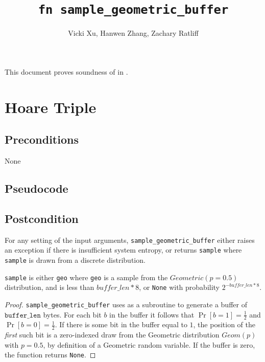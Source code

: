 \documentclass{article}
\title{\texttt{fn sample\_geometric\_buffer}}
\author{Vicki Xu, Hanwen Zhang, Zachary Ratliff}
\begin{document}
\maketitle

This document proves soundness of  in .

\section{Hoare Triple}
\subsection*{Preconditions}
None

\subsection*{Pseudocode}


\subsection*{Postcondition}
For any setting of the input arguments, \texttt{sample\_geometric\_buffer} either
raises an exception if there is insufficient system entropy,
or returns \texttt{sample} where \texttt{sample} is drawn from a discrete distribution.

\texttt{sample} is either
\texttt{geo} where \texttt{geo} is a sample from the $Geometric(p=0.5)$ distribution, and is less than $buffer\_len * 8$, or
\texttt{None} with probability $2^{-buffer\_len * 8}$.

\begin{proof}
    \texttt{sample\_geometric\_buffer} uses  as a subroutine to generate a buffer of $\texttt{buffer\_len}$ bytes.
    For each bit $b$ in the buffer it follows that $\Pr[b = 1] = \frac{1}{2}$ and $\Pr[b = 0] = \frac{1}{2}$.
    If there is some bit in the buffer equal to $1$,
    the position of the \emph{first} such bit is a zero-indexed draw from the Geometric distribution $Geom(p)$ with $p = 0.5$,
    by definition of a Geometric random variable.
    If the buffer is zero, the function returns \texttt{None}.
\end{proof}
\end{document}
